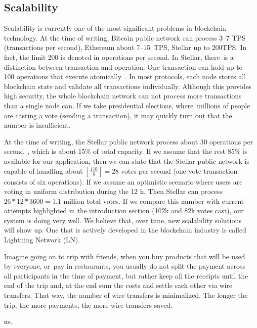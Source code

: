 \documentclass[applsci,article,accept,moreauthors,pdftex]{Definitions/mdpi}
\newcommand{\floor}[1]{\left\lfloor #1 \right\rfloor}
\begin{document}
\subsection{Scalability}
Scalability is currently one of the most significant problems in blockchain technology. At the time of writing, Bitcoin public network can process 3--7 TPS (transactions per second), Ethereum about 7--15~TPS, Stellar up to 200TPS. In fact, the limit 200 is denoted in operations per second. %
In Stellar, there~is a distinction between transaction and operation. One transaction can hold up to 100 operations 
that execute atomically~\cite{Protocol19:online}. 
In most protocols, each node stores all blockchain state and validate all transactions individually. Although this provides high security, the whole blockchain network can not process more transactions than a single node can. If we take presidential elections, where~millions of people are casting a vote (sending a transaction), it may quickly turn out that the number is insufficient.

At the time of writing, the Stellar public network process about 30 operations per second~\cite{StellarN45:online}, which is about 15\% of total capacity. If we assume that the rest 85\% is available for our application, then we can state that the Stellar public network is capable of handling about $\floor{\frac{170}{6}} = 28$ votes per second (one vote transaction consists of six operations). If we assume an optimistic scenario where users are voting in uniform distribution during the 12 h. Then Stellar can process $26 * 12 * 3600 = 1.1$ million total votes. If we compare this number with current attempts highlighted in the introduction section (102k and 82k votes cast), our system is doing very well. 
We believe that, over time, new scalability solutions will show up. One that is actively developed in the blockchain industry is called Lightning Network (LN).

Imagine going on to trip with friends, when you buy products that will be used by everyone, or~pay in restaurants, you usually do not split the payment across all participants in the time of payment, but rather keep all the receipts until the end of the trip and, at the end sum the costs and settle each other via wire transfers. That way, the number of wire transfers is minimalized. The longer the trip, the more payments, the more wire transfers saved.

ns. 
\end{document}
